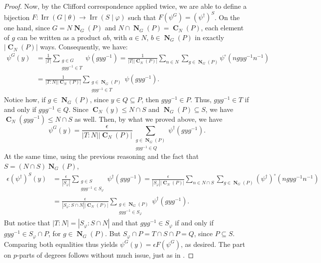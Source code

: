 \documentclass[12pt]{amsart}
\DeclareMathOperator{\CB}{\mathbf{C}}
\DeclareMathOperator{\NB}{\mathbf{N}}
\DeclareMathOperator{\Irr}{Irr}
\theoremstyle{remark}
\theoremstyle{definition}
\theoremstyle{plain}
\theoremstyle{definition}
\numberwithin{equation}{section}
\begin{document}
\begin{proof}
	Now, by the Clifford correspondence applied twice, we are able to define a bijection $F: \Irr(G \mid \theta) \to \Irr(S \mid \varphi)$ such that $F(\psi^G) = (\psi^\dagger)^S$. On the one hand, since $G = N\NB_G(P)$ and $N \cap \NB_G(P) = \CB_N(P)$, each element of $g$ can be written as a product $ab$, with $a \in N$, $b \in \NB_G(P)$ in exactly $|\CB_N(P)|$ ways. Consequently, we have:
	\begin{align*}
		\psi^G(y) &= \frac{1}{|T|} \sum_{\substack{g \in G \\ gyg^{-1} \in T}} \psi(gyg^{-1}) = \frac{1}{|T||\CB_N(P)|} \sum_{n \in N}\sum_{g \in \NB_G(P)} \psi^\circ(ngyg^{-1}n^{-1}) \\
		&= \frac{1}{|T:N||\CB_N(P)|}\sum_{\substack{g \in \NB_G(P) \\ gyg^{-1} \in T}} \psi(gyg^{-1}).
	\end{align*}
	Notice how, if $g \in \NB_G(P)$, since $y \in Q \subseteq P$, then $gyg^{-1} \in P$. Thus, $gyg^{-1} \in T$ if and only if $gyg^{-1} \in Q$. Since $\CB_N(y) \leq N \cap S$ and $\NB_G(P) \subseteq S$, we have $\CB_N(gyg^{-1}) \leq N \cap S$ as well. Then, by what we proved above, we have
	\begin{equation*}
		\psi^G(y) = \frac{\epsilon}{|T:N||\CB_N(P)|}\sum_{\substack{g \in \NB_G(P) \\ gyg^{-1} \in Q}} \psi^\dagger(gyg^{-1}).
	\end{equation*}
	At the same time, using the previous reasoning and the fact that $S = (N \cap S)\NB_G(P)$,
	\begin{align*}
		\epsilon(\psi^\dagger)^S(y) &= \frac{\epsilon}{|S_\varphi|}\sum_{\substack{g \in S \\ gyg^{-1} \in S_\varphi}} \psi^\dagger(gyg^{-1}) = \frac{\epsilon}{|S_\varphi||\CB_N(P)|} \sum_{n \in N \cap S} \sum_{g \in \NB_G(P)} (\psi^\dagger)^\circ(ngyg^{-1}n^{-1}) \\
		&= \frac{\epsilon}{|S_\varphi: S \cap N||\CB_N(P)|} \sum_{\substack{g \in \NB_G(P) \\ gyg^{-1} \in S_\varphi}} \psi^\dagger(gyg^{-1}).
	\end{align*}
	But notice that $|T:N| = |S_\varphi:S\cap N|$ and that $gyg^{-1} \in S_\varphi$ if and only if $gyg^{-1} \in S_\varphi \cap P$, for $g \in \NB_G(P)$. But $S_\varphi \cap P = T \cap S \cap P = Q$, since $P \subseteq S$. Comparing both equalities thus yields $\psi^G(y) = \epsilon F(\psi^G)$, as desired. The part on $p$-parts of degrees follows without much issue, just as in .
\end{proof}
\end{document}
